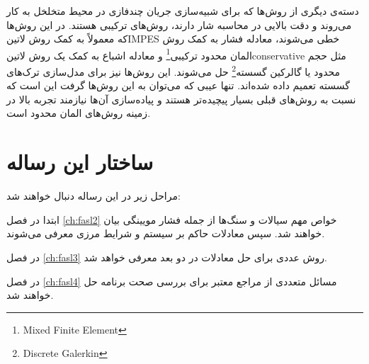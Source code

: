 دسته‌ی دیگری از روش‌ها که برای شبیه‌سازی جریان چند‌فازی در محیط متخلخل به کار می‌روند و دقت بالایی در محاسبه شار دارند، روش‌های ترکیبی هستند. در این روش‌ها که معمولاً به کمک روش \text‌لاتین{IMPES} خطی می‌شوند، معادله فشار به کمک روش المان محدود ترکیبی\footnote{Mixed Finite Element} و معادله اشباع به کمک یک روش \text‌لاتین{conservative} مثل حجم محدود\cite{helmig} یا گالرکین گسسته\footnote{Discrete Galerkin}\cite{hoteitn} حل می‌شوند. این روش‌ها نیز برای مدل‌سازی ترک‌های گسسته تعمیم داده شده‌اند\cite{hoteitf}. تنها عیبی که می‌توان به این روش‌ها گرفت این است که نسبت به روش‌های قبلی بسیار پیچیده‌تر هستند و پیاده‌سازی آن‌ها نیازمند تجربه بالا در زمینه روش‌های المان محدود است.

\section{ساختار این رساله}

مراحل زیر در این رساله دنبال خواهند شد:
\begin{tight_itemize}
\item ابتدا در فصل \ref{ch:fasl2} خواص مهم سیالات و سنگ‌ها از جمله فشار مویینگی بیان خواهند شد. سپس معادلات حاکم بر سیستم و شرایط مرزی معرفی می‌شوند.
\item در فصل \ref{ch:fasl3} روش عددی برای حل معادلات در دو بعد معرفی خواهد شد.
\item در فصل \ref{ch:fasl4} مسائل متعددی از مراجع معتبر برای بررسی صحت برنامه حل خواهند شد.
\end{tight_itemize}
